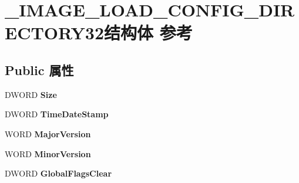 \hypertarget{struct___i_m_a_g_e___l_o_a_d___c_o_n_f_i_g___d_i_r_e_c_t_o_r_y32}{}\section{\+\_\+\+I\+M\+A\+G\+E\+\_\+\+L\+O\+A\+D\+\_\+\+C\+O\+N\+F\+I\+G\+\_\+\+D\+I\+R\+E\+C\+T\+O\+R\+Y32结构体 参考}
\label{struct___i_m_a_g_e___l_o_a_d___c_o_n_f_i_g___d_i_r_e_c_t_o_r_y32}
\subsection*{Public 属性}
\begin{DoxyCompactItemize}
\item 
\mbox{\label{struct___i_m_a_g_e___l_o_a_d___c_o_n_f_i_g___d_i_r_e_c_t_o_r_y32_ac3b944da9b882367bf29a7e161afc80f}} 
D\+W\+O\+RD {\bfseries Size}
\item 
\mbox{\label{struct___i_m_a_g_e___l_o_a_d___c_o_n_f_i_g___d_i_r_e_c_t_o_r_y32_a0572a98a38e0ce3af1f791c291b67eb5}} 
D\+W\+O\+RD {\bfseries Time\+Date\+Stamp}
\item 
\mbox{\label{struct___i_m_a_g_e___l_o_a_d___c_o_n_f_i_g___d_i_r_e_c_t_o_r_y32_a39b47fc8ca0059b678d6f54971953752}} 
W\+O\+RD {\bfseries Major\+Version}
\item 
\mbox{\label{struct___i_m_a_g_e___l_o_a_d___c_o_n_f_i_g___d_i_r_e_c_t_o_r_y32_abf05b590e9fa78a8c5f5d64c35ef9089}} 
W\+O\+RD {\bfseries Minor\+Version}
\item 
\mbox{\label{struct___i_m_a_g_e___l_o_a_d___c_o_n_f_i_g___d_i_r_e_c_t_o_r_y32_a5267892bc3f33aa35a339e5a887e9dea}} 
D\+W\+O\+RD {\bfseries Global\+Flags\+Clear}
\item 
\mbox{\label{struct___i_m_a_g_e___l_o_a_d___c_o_n_f_i_g___d_i_r_e_c_t_o_r_y32_a415d13e9b3b6a503dff2551ec5be22ee}} 

\end{DoxyCompactItemize}

